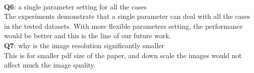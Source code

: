 \documentclass[10pt,twocolumn,letterpaper]{article}
\begin{document}
\\
\textbf{Q6}: a single parameter setting for all the cases 
\\
The experiments demonstrate that a single parameter can deal with all the cases in the tested datasets. With more flexible parameters setting, the performance would be better and this is the line of our future work.
\\
\textbf{Q7}: why is the image resolution significantly smaller
\\
This is for smaller pdf size of the paper, and down scale the images would not affect much the image quality.



{\small


}
\end{document}
